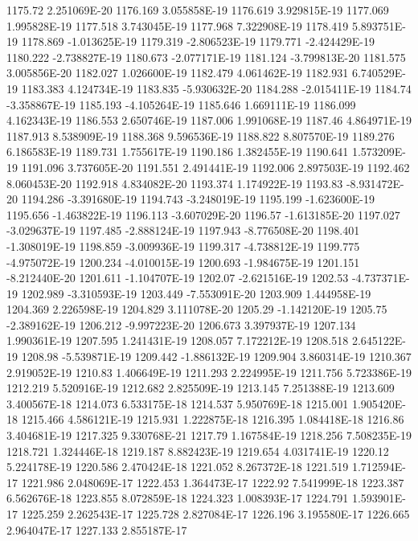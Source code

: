 1175.72  2.251069E-20
1176.169  3.055858E-19
1176.619  3.929815E-19
1177.069  1.995828E-19
1177.518  3.743045E-19
1177.968  7.322908E-19
1178.419  5.893751E-19
1178.869  -1.013625E-19
1179.319  -2.806523E-19
1179.771  -2.424429E-19
1180.222  -2.738827E-19
1180.673  -2.077171E-19
1181.124  -3.799813E-20
1181.575  3.005856E-20
1182.027  1.026600E-19
1182.479  4.061462E-19
1182.931  6.740529E-19
1183.383  4.124734E-19
1183.835  -5.930632E-20
1184.288  -2.015411E-19
1184.74  -3.358867E-19
1185.193  -4.105264E-19
1185.646  1.669111E-19
1186.099  4.162343E-19
1186.553  2.650746E-19
1187.006  1.991068E-19
1187.46  4.864971E-19
1187.913  8.538909E-19
1188.368  9.596536E-19
1188.822  8.807570E-19
1189.276  6.186583E-19
1189.731  1.755617E-19
1190.186  1.382455E-19
1190.641  1.573209E-19
1191.096  3.737605E-20
1191.551  2.491441E-19
1192.006  2.897503E-19
1192.462  8.060453E-20
1192.918  4.834082E-20
1193.374  1.174922E-19
1193.83  -8.931472E-20
1194.286  -3.391680E-19
1194.743  -3.248019E-19
1195.199  -1.623600E-19
1195.656  -1.463822E-19
1196.113  -3.607029E-20
1196.57  -1.613185E-20
1197.027  -3.029637E-19
1197.485  -2.888124E-19
1197.943  -8.776508E-20
1198.401  -1.308019E-19
1198.859  -3.009936E-19
1199.317  -4.738812E-19
1199.775  -4.975072E-19
1200.234  -4.010015E-19
1200.693  -1.984675E-19
1201.151  -8.212440E-20
1201.611  -1.104707E-19
1202.07  -2.621516E-19
1202.53  -4.737371E-19
1202.989  -3.310593E-19
1203.449  -7.553091E-20
1203.909  1.444958E-19
1204.369  2.226598E-19
1204.829  3.111078E-20
1205.29  -1.142120E-19
1205.75  -2.389162E-19
1206.212  -9.997223E-20
1206.673  3.397937E-19
1207.134  1.990361E-19
1207.595  1.241431E-19
1208.057  7.172212E-19
1208.518  2.645122E-19
1208.98  -5.539871E-19
1209.442  -1.886132E-19
1209.904  3.860314E-19
1210.367  2.919052E-19
1210.83  1.406649E-19
1211.293  2.224995E-19
1211.756  5.723386E-19
1212.219  5.520916E-19
1212.682  2.825509E-19
1213.145  7.251388E-19
1213.609  3.400567E-18
1214.073  6.533175E-18
1214.537  5.950769E-18
1215.001  1.905420E-18
1215.466  4.586121E-19
1215.931  1.222875E-18
1216.395  1.084418E-18
1216.86  3.404681E-19
1217.325  9.330768E-21
1217.79  1.167584E-19
1218.256  7.508235E-19
1218.721  1.324446E-18
1219.187  8.882423E-19
1219.654  4.031741E-19
1220.12  5.224178E-19
1220.586  2.470424E-18
1221.052  8.267372E-18
1221.519  1.712594E-17
1221.986  2.048069E-17
1222.453  1.364473E-17
1222.92  7.541999E-18
1223.387  6.562676E-18
1223.855  8.072859E-18
1224.323  1.008393E-17
1224.791  1.593901E-17
1225.259  2.262543E-17
1225.728  2.827084E-17
1226.196  3.195580E-17
1226.665  2.964047E-17
1227.133  2.855187E-17
